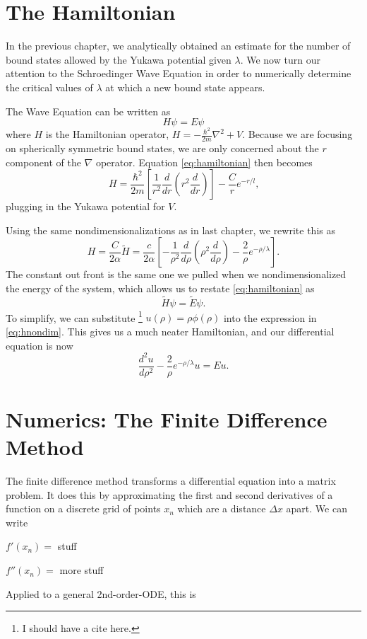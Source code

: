 \documentclass[12pt,twoside]{reedthesis}
\newcommand{\eqn}[1]{\begin{equation}#1\end{equation}}
\begin{document}
\section{The Hamiltonian}

In the previous chapter, we analytically obtained an estimate for the number of bound states allowed by the Yukawa potential given $\lambda$. We now turn our attention to the Schroedinger Wave Equation in order to numerically determine the critical values of $\lambda$ at which a new bound state appears. 

The Wave Equation can be written as
\eqn{
H \psi = E\psi
\label{eq:hamiltonian}
}
where $H$ is the Hamiltonian operator, $H =-\frac{\hbar^2}{2m}\nabla^2 +V$.  Because we are focusing on spherically symmetric bound states, we are only concerned about the $r$ component of the $\nabla$ operator. Equation \eqref{eq:hamiltonian} then becomes
\eqn{
H = \frac{\hbar^2}{2m} \left[\frac{1}{r^2}\frac{d}{dr}\left(r^2 \frac{d}{dr}\right)\right] - \frac{C}{r}e^{-r/l}\mbox{,}
}
plugging in the Yukawa potential for $V$.

Using the same nondimensionalizations as in last chapter, we rewrite this as 
\eqn{
H=\frac{C}{2\alpha}\tilde{H} = \frac{c}{2\alpha} \left[- \frac{1}{\rho^2}\frac{d}{d\rho}\left(\rho^2\frac{d}{d\rho}\right) - \frac{2}{\rho}e^{-\rho/\lambda}\right]\mbox{.}
\label{eq:hnondim}
}
The constant out front is the same one we pulled when we nondimensionalized the energy of the system, which allows us to restate \eqref{eq:hamiltonian} as
\eqn{
\tilde{H}\psi = \tilde{E}\psi\mbox{.}
}
To simplify, we can substitute \footnote{I should have a cite here.} $u(\rho)=\rho \phi(\rho)$ into the expression in \eqref{eq:hnondim}. This gives us a much neater Hamiltonian, and our differential equation is now
\eqn{
\frac{d^2 u }{d \rho^2} - \frac{2}{\rho}e^{-\rho/\lambda}u = E u\mbox{.}
\label{eq:hamiltonianfinal}
}

\section{Numerics: The Finite Difference Method}
The finite difference method transforms a differential equation into a matrix problem. It does this by approximating the first and second derivatives of a function on a discrete grid of points $x_n$ which are a distance $\Delta x$ apart. We can write

$f'(x_n) =$ stuff

$f''(x_n) =$ more stuff

Applied to a general 2nd-order-ODE, this is
\end{document}
